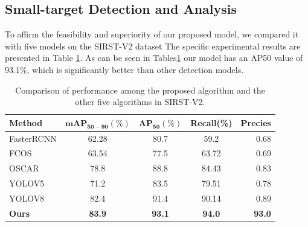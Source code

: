 \documentclass[journal]{IEEEtran}
\begin{document}
\subsection{Small-target  Detection and Analysis}
To affirm the feasibility and superiority of our proposed model, we compared it with five models on the SIRST-V2 dataset The specific experimental results are presented in Table \ref{tab:univ-compa}. As can be seen in Tables\ref{tab:univ-compa} our model has an AP50 value of 93.1\%, which is significantly better than other detection models. 
\begin{table}[!t]
    \centering
    \caption{Comparison of performance among the proposed algorithm and the other five algorithms in SIRST-V2.}
    \label{tab:univ-compa}
    \begin{tabular}{lcccr}
    \toprule
        \textbf{Method} & $\mathbf{mAP_{50-90}{(\%)}} $ & $ \mathbf{AP_{50}{(\%)}}$ & \textbf{Recall{(\%)}} & \textbf{Precies}  \\ 
        \midrule
        FasterRCNN & 62.28  & 80.7   & 59.2     & 0.68\\ 
        FCOS       & 63.54  & 77.5   & 63.72    & 0.69\\ 
        OSCAR      & 78.8   & 88.8   & 84.43     & 0.83\\
        YOLOV5     & 71.2   & 83.5   & 79.51     & 0.78\\
        YOLOV8     & 82.4   & 91.4   & 90.14       & 0.89\\
        \textbf{Ours} & \textbf{83.9} & \textbf{93.1}   &  \textbf{94.0}    &  \textbf{93.0} \\
    \bottomrule
    \end{tabular}
\end{table}
\end{document}
